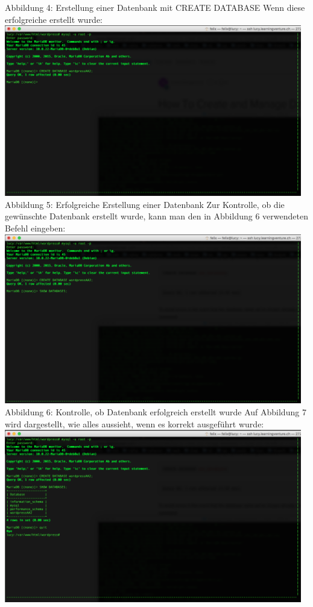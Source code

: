 \documentclass{article}
\begin{document}
	Abbildung 4: Erstellung einer Datenbank mit CREATE DATABASE
	\newline
	\newline
	Wenn diese erfolgreiche erstellt wurde:
	\newline
	\includegraphics[width=13cm]{../Pics/23-maria-db-create-success}
	Abbildung 5: Erfolgreiche Erstellung einer Datenbank
	\newline
	\newline
	Zur Kontrolle, ob die gewünschte Datenbank erstellt wurde, kann man den in Abbildung 6 verwendeten Befehl eingeben:
	\newline
	\includegraphics[width=13cm]{../Pics/24-maria-db-show}
	Abbildung 6: Kontrolle, ob Datenbank erfolgreich erstellt wurde
	\newline
	\newline
	Auf Abbildung 7 wird dargestellt, wie alles aussieht, wenn es korrekt ausgeführt wurde:
	\newline
	\includegraphics[width=13cm]{../Pics/27-maria-db-quit-success}
\end{document}
